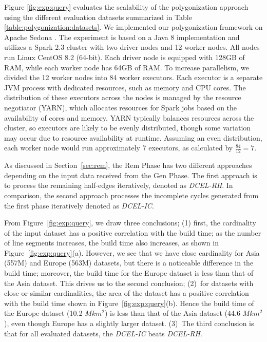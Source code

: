 Figure \ref{fig:exp:query} evaluates the scalability of the polygonization approach using the different evaluation datasets summarized in Table 
\ref{table:polygonization:datasets}.  We implemented our polygonization framework on Apache Sedona \cite{yu_spatial_2018}. The experiment is based on a Java 8  
implementation and utilizes a Spark 2.3 cluster with two driver nodes and 12 worker nodes. All nodes run Linux CentOS 8.2 (64-bit). Each driver node is equipped 
with 128GB of RAM, while each worker node has 64GB of RAM. To increase parallelism, we divided the 12 worker nodes into 84 worker executors. Each executor is a 
separate JVM process with dedicated resources, such as memory and CPU cores. The distribution of these executors across the nodes is managed by the resource 
negotiator (YARN), which allocates resources for Spark jobs based on the availability of cores and memory. YARN typically balances resources across the cluster, 
so executors are likely to be evenly distributed, though some variation may occur due to resource availability at runtime. Assuming an even distribution, each 
worker node would run approximately 7 executors, as calculated by $\frac{84}{12} = 7$.

As discussed in Section~\ref{sec:rem}, the Rem Phase has two different approaches depending on the input data received from the Gen Phase. The first approach is to process the remaining half-edges iteratively, denoted as \textit{DCEL-RH}. In comparison, the second approach processes the incomplete cycles generated from the first phase iteratively denoted as \textit{DCEL-IC}.

From Figure~\ref{fig:exp:query}, we draw three conclusions; 
(1) first, the cardinality of the input dataset has a positive correlation with the build time; as the number of line segments increases, the build time also increases, as shown in Figure~\ref{fig:exp:query}(a). However, we see that we have close cardinality for Asia (557M) and Europe (563M) datasets, but there is a noticeable difference in the build time; moreover, the build time for the Europe dataset is less than that of the Asia dataset. 
This drives us to the second conclusion;  
(2)~for datasets with close or similar cardinalities, the area of the dataset has a positive correlation with the build time shown in Figure~\ref{fig:exp:query}(b). 
Hence the build time of the Europe dataset (10.2 $Mkm^2$) is less than that of the Asia dataset (44.6 $Mkm^2$), even though Europe has a slightly larger dataset.
(3)~The third conclusion is that for all evaluated datasets, the \textit{DCEL-IC} beats \textit{DCEL-RH}.


